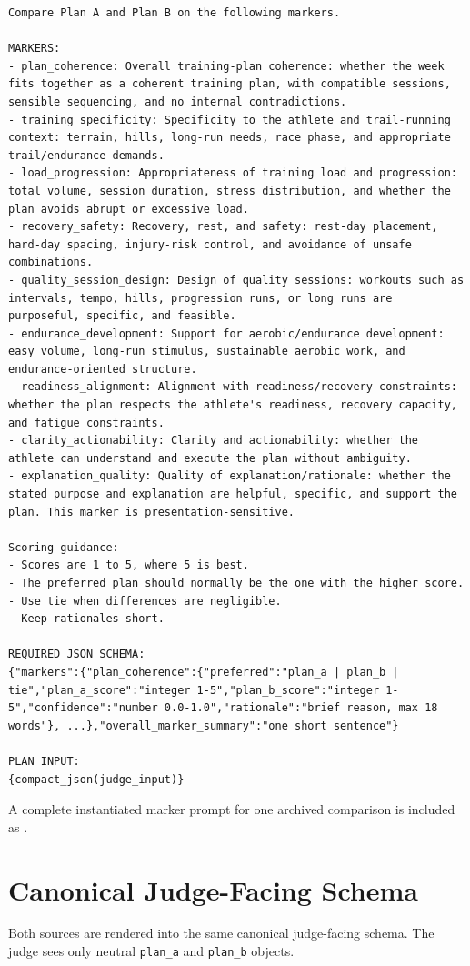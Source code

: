 \begin{lstlisting}
Compare Plan A and Plan B on the following markers.

MARKERS:
- plan_coherence: Overall training-plan coherence: whether the week fits together as a coherent training plan, with compatible sessions, sensible sequencing, and no internal contradictions.
- training_specificity: Specificity to the athlete and trail-running context: terrain, hills, long-run needs, race phase, and appropriate trail/endurance demands.
- load_progression: Appropriateness of training load and progression: total volume, session duration, stress distribution, and whether the plan avoids abrupt or excessive load.
- recovery_safety: Recovery, rest, and safety: rest-day placement, hard-day spacing, injury-risk control, and avoidance of unsafe combinations.
- quality_session_design: Design of quality sessions: workouts such as intervals, tempo, hills, progression runs, or long runs are purposeful, specific, and feasible.
- endurance_development: Support for aerobic/endurance development: easy volume, long-run stimulus, sustainable aerobic work, and endurance-oriented structure.
- readiness_alignment: Alignment with readiness/recovery constraints: whether the plan respects the athlete's readiness, recovery capacity, and fatigue constraints.
- clarity_actionability: Clarity and actionability: whether the athlete can understand and execute the plan without ambiguity.
- explanation_quality: Quality of explanation/rationale: whether the stated purpose and explanation are helpful, specific, and support the plan. This marker is presentation-sensitive.

Scoring guidance:
- Scores are 1 to 5, where 5 is best.
- The preferred plan should normally be the one with the higher score.
- Use tie when differences are negligible.
- Keep rationales short.

REQUIRED JSON SCHEMA:
{"markers":{"plan_coherence":{"preferred":"plan_a | plan_b | tie","plan_a_score":"integer 1-5","plan_b_score":"integer 1-5","confidence":"number 0.0-1.0","rationale":"brief reason, max 18 words"}, ...},"overall_marker_summary":"one short sentence"}

PLAN INPUT:
{compact_json(judge_input)}
\end{lstlisting}
A complete instantiated marker prompt for one archived comparison is included as .

\section{Canonical Judge-Facing Schema}
\label{app:schema}
Both sources are rendered into the same canonical judge-facing schema. The judge sees only neutral \texttt{plan\_a} and \texttt{plan\_b} objects.


